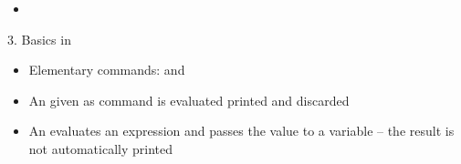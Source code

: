 \documentclass[14pt, aspectratio=169, sectionpage=simple, xclolor=table]{beamer}
\begin{document}
\begin{frame}[lbslide]{}
\begin{itemize}
\item {}
\end{itemize}
\end{frame}
\begin{frame}[fragile]{3. Basics in \R}
\begin{itemize}
	\item Elementary commands:  and
	\nl
	\item An  given as command is evaluated printed
	and discarded
	\nl
	\item An  evaluates an expression and passes the value to a
	variable -- the result is not automatically printed
\end{itemize}
\end{frame}
\end{document}
